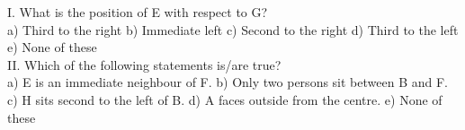 \documentclass[
]{article}
\begin{document}
I. What is the position of E with respect to G?\\
a) Third to the right \hspace{2mm}b) Immediate left \hspace{2mm}c) Second to the right \hspace{2mm}d) Third to the left \hspace{2mm}e) None of these\\

II. Which of the following statements is/are true?\\
a) E is an immediate neighbour of F. \hspace{2mm}b) Only two persons sit between B and F.
\hspace{2mm}c) H sits second to the left of B. \hspace{2mm}d) A faces outside from the centre.
\hspace{2mm}e) None of these\\
\end{document}

